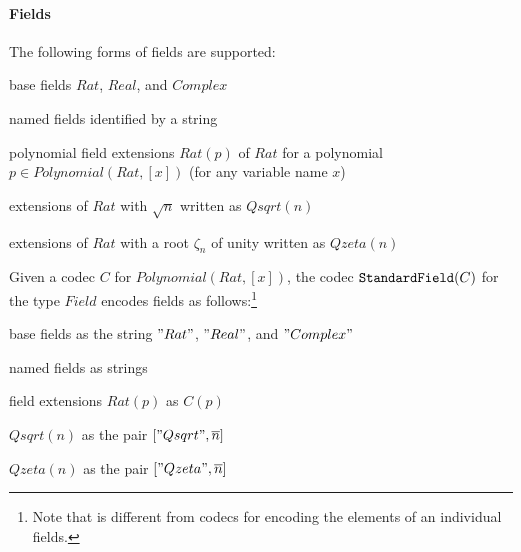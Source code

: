 \paragraph{Fields}
The following forms of fields are supported:
\begin{compactitem}
 \item base fields $Rat$, $Real$, and $Complex$
 \item named fields identified by a string
 \item polynomial field extensions $Rat(p)$ of $Rat$ for a polynomial $p\in Polynomial(Rat,[x])$ (for any variable name $x$)
 \item extensions of $Rat$ with $\sqrt n$ written as $Qsqrt(n)$
 \item extensions of $Rat$ with a root $\zeta_n$ of unity written as $Qzeta(n)$
\end{compactitem}

Given a codec $C$ for $Polynomial(Rat,[x])$, the codec $\cn{StandardField}(C)$ for the type $Field$ encodes fields as follows:\footnote{Note that is different from codecs for encoding the elements of an individual fields.}
\begin{compactitem}
 \item base fields as the string $"Rat"$, $"Real"$, and $"Complex"$
 \item named fields as strings
 \item field extensions $Rat(p)$ as $C(p)$
 \item $Qsqrt(n)$ as the pair $["Qsqrt", \ov{n}]$
 \item $Qzeta(n)$ as the pair $["Qzeta", \ov{n}]$
\end{compactitem}

